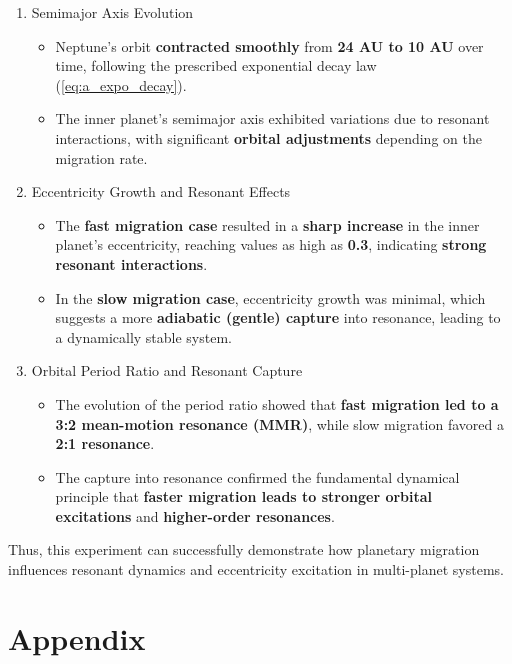 \documentclass[12pt,a4paper]{article}
\begin{document}
\begin{enumerate}
  \item Semimajor Axis Evolution
  \begin{itemize}
    \item Neptune’s orbit \textbf{contracted smoothly} from \textbf{24 AU to 10 AU} over time, following the prescribed exponential decay law (\ref{eq:a_expo_decay}).
    \item The inner planet's semimajor axis exhibited variations due to resonant interactions, with significant \textbf{orbital adjustments} depending on the migration rate.
  \end{itemize}
  \item Eccentricity Growth and Resonant Effects
  \begin{itemize}
    \item The \textbf{fast migration case} resulted in a \textbf{sharp increase} in the inner planet’s eccentricity, reaching values as high as \textbf{0.3}, indicating \textbf{strong resonant interactions}.
    \item In the \textbf{slow migration case}, eccentricity growth was minimal, which suggests a more \textbf{adiabatic (gentle) capture} into resonance, leading to a dynamically stable system.
  \end{itemize}
  \item Orbital Period Ratio and Resonant Capture
  \begin{itemize}
    \item The evolution of the period ratio showed that \textbf{fast migration led to a 3:2 mean-motion resonance (MMR)}, while slow migration favored a \textbf{2:1 resonance}.
    \item The capture into resonance confirmed the fundamental dynamical principle that \textbf{faster migration leads to stronger orbital excitations} and \textbf{higher-order resonances}.
  \end{itemize}
\end{enumerate}

\noindent Thus, this experiment can successfully demonstrate how planetary migration influences resonant dynamics and eccentricity excitation in multi-planet systems.

\setcounter{secnumdepth}{0}

\printbibliography     
\appendix
\section{Appendix}
\end{document}
